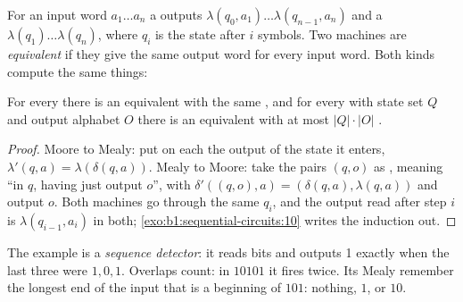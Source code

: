 For an input word $a_1 \dots a_n$ a  outputs $\lambda(q_0, a_1) \dots \lambda(q_{n-1}, a_n)$ and a  $\lambda(q_1) \dots \lambda(q_n)$, where $q_i$ is the state after $i$ symbols. Two machines are
\emph{equivalent} if they give the same output word for every input word. Both kinds compute the same things:

\begin{proposition}\label{prop:b1:sequential-circuits:conversion}
For every  there is an equivalent  with the same , and for every  with state
set $Q$ and output alphabet $O$ there is an equivalent  with at most $|Q| \cdot |O|$ .
\end{proposition}

\begin{proof}
Moore to Mealy: put on each  the output of the state it enters, $\lambda'(q, a) = \lambda(\delta(q, a))$. Mealy to
Moore: take the pairs $(q, o)$ as , meaning ``in $q$, having just output $o$'', with $\delta'((q, o), a) = (\delta(q,
a), \lambda(q, a))$ and output $o$. Both machines go through the same  $q_i$, and the output read after step $i$ is
$\lambda(q_{i-1}, a_i)$ in both; \cref{exo:b1:sequential-circuits:10} writes the induction out.
\end{proof}

\label{lst:b1:sequential-circuits:conversion}

The example is a \emph{sequence detector}: it reads bits and outputs 1 exactly when the last three were $1, 0, 1$.
Overlaps count: in $10101$ it fires twice. Its Mealy  remember the longest end of the input that is a beginning of
$101$: nothing, $1$, or $10$.

\label{out:b1:sequential-circuits:conversion}

